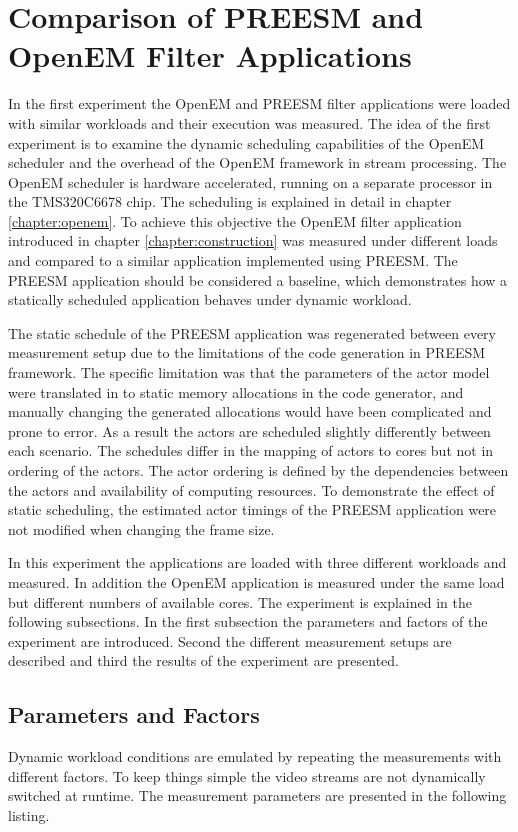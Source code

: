 \section{Comparison of PREESM and OpenEM Filter Applications}
\label{sec:firstexperiment}
In the first experiment the OpenEM and PREESM filter applications were loaded
with similar workloads and their execution was measured. The idea of the first
experiment is to examine the dynamic scheduling capabilities of the OpenEM
scheduler and the overhead of the OpenEM framework in stream processing. The
OpenEM scheduler is hardware accelerated, running on a separate processor in the
TMS320C6678 chip. The scheduling is explained in detail in chapter
\ref{chapter:openem}. To achieve this objective the OpenEM filter application
introduced in chapter \ref{chapter:construction} was measured under different
loads and compared to a similar application implemented using PREESM. The
PREESM application should be considered a baseline, which demonstrates how a
statically scheduled application behaves under dynamic workload.

The static schedule of the PREESM application was regenerated between every
measurement setup due to the limitations of the code generation in PREESM
framework. The specific limitation was that the parameters of the actor model
were translated in to static memory allocations in the code generator, and
manually changing the generated allocations would have been complicated and
prone to error. As a result the actors are scheduled slightly differently
between each scenario. The schedules differ in the mapping of actors to cores
but not in ordering of the actors. The actor ordering is defined by the
dependencies between the actors and availability of computing resources. To
demonstrate the effect of static scheduling, the estimated actor timings of the
PREESM application were not modified when changing the frame size.

In this experiment the applications are loaded with three different workloads
and measured. In addition the OpenEM application is measured under the same load
but different numbers of available cores. The experiment is explained in the
following subsections. In the first subsection the parameters and factors of the
experiment are introduced. Second the different measurement setups are described
and third the results of the experiment are presented.

\subsection{Parameters and Factors}
Dynamic workload conditions are emulated by repeating the measurements with
different factors. To keep things simple the video streams are not dynamically
switched at runtime. The measurement parameters are presented in the following
listing.


